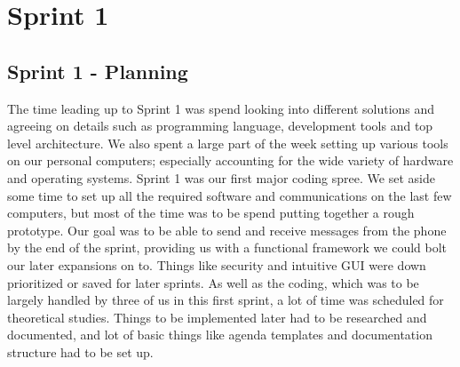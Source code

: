 \chapter{Sprint 1}

\section{Sprint 1 - Planning}
The time leading up to Sprint 1 was spend looking into different solutions and agreeing on details such as programming language, development tools and top level architecture. We also spent a large part of the week setting up various tools on our personal computers; especially accounting for the wide variety of hardware and operating systems.
\newline
\newline
Sprint 1 was our first major coding spree. We set aside some time to set up all the required software and communications on the last few computers, but most of the time was to be spend putting together a rough prototype. Our goal was to be able to send and receive messages from the phone by the end of the sprint, providing us with a functional framework we could bolt our later expansions on to. Things like security and intuitive GUI were down prioritized or saved for later sprints.
\newline
\newline
As well as the coding, which was to be largely handled by three of us in this first sprint, a lot of time was scheduled for theoretical studies. Things to be implemented later had to be researched and documented, and lot of basic things like agenda templates and documentation structure had to be set up.